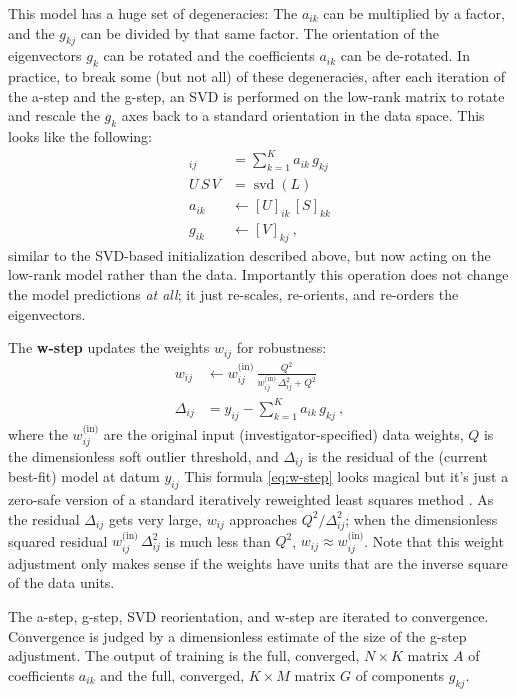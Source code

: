 \documentclass{article}
\DeclareMathOperator{\svd}{svd}
\begin{document}
This model has a huge set of degeneracies:
The $a_{ik}$ can be multiplied by a factor, and the $g_{kj}$ can be divided by that same factor.
The orientation of the eigenvectors $g_k$ can be rotated and the coefficients $a_{ik}$ can be de-rotated.
In practice, to break some (but not all) of these degeneracies, after each iteration of the a-step and the g-step,
an SVD is performed on the low-rank matrix
to rotate and rescale the $g_k$ axes back to a standard orientation in the data space.
This looks like the following:
\begin{align}
    [L]_{ij} &= \sum_{k=1}^K a_{ik}\,g_{kj} \\
    U\,S\,V &= \svd(L) \\
    a_{ik} &\leftarrow [U]_{ik}\,[S]_{kk} \\
    g_{ik} &\leftarrow [V]_{kj} ~,
\end{align}
similar to the SVD-based initialization described above, but now acting on the low-rank model rather than the data.
Importantly this operation does not change the model predictions \emph{at all}; it just re-scales, re-orients, and re-orders the eigenvectors.

The \textbf{w-step} updates the weights $w_{ij}$ for robustness:
\begin{align}
    w_{ij} &\leftarrow w^\text{(in)}_{ij}\,\frac{Q^2}{w^\text{(in)}_{ij}\,\Delta_{ij}^2 + Q^2} \label{eq:w-step} \\
    \Delta_{ij} &= y_{ij} - \sum_{k=1}^K a_{ik}\,g_{kj} ~,
\end{align}
where the $w^\text{(in)}_{ij}$ are the original input (investigator-specified) data weights,
$Q$ is the dimensionless soft outlier threshold,
and $\Delta_{ij}$ is the residual of the (current best-fit) model at datum $y_{ij}$
This formula \eqref{eq:w-step} looks magical but it's just a zero-safe version of a standard iteratively reweighted least squares method \cite{irls}.
As the residual $\Delta_{ij}$ gets very large, $w_{ij}$ approaches $Q^2 / \Delta_{ij}^2$; when the dimensionless squared residual $w^\text{(in)}_{ij}\,\Delta_{ij}^2$ is much less than $Q^2$, $w_{ij}\approx w^\text{(in)}_{ij}$.
Note that this weight adjustment only makes sense if the weights have units that are the inverse square of the data units.

The a-step, g-step, SVD reorientation, and w-step are iterated to convergence.
Convergence is judged by a dimensionless estimate of the size of the g-step adjustment.
The output of training is the full, converged, $N\times K$ matrix $A$ of coefficients $a_{ik}$ and the full, converged, $K\times M$ matrix $G$ of components $g_{kj}$.
\end{document}
